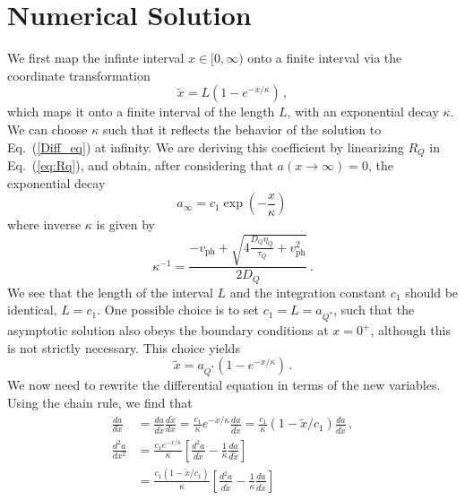\documentclass[superscriptaddress,amsmath,floatfix,aps,prc,twocolumn]{revtex4-1}
\newcommand{\AH}[1]{\textsf{\color{cyan}{\textsuperscript{AH}#1}}}
\newcommand{\JS}[1]{\textsf{\color{violet} {[\textsuperscript{JS}#1]}}}
\begin{document}
\section{Numerical Solution}
We first map the infinte interval $x\in[0,\infty)$ onto a finite interval via the coordinate transformation
\begin{equation}
    \tilde{x}=L\left(1-e^{-x/\kappa}\right) \, ,
\end{equation}
which maps it onto a finite interval of the length $L$, with an exponential decay $\kappa$. We can choose $\kappa$ such that it reflects the behavior of the solution to Eq.~(\ref{Diff_eq}) at infinity. We are deriving this coefficient by linearizing $R_Q$ in Eq.~(\ref{eq:Rq}), and obtain, after considering that $a(x\to\infty)=0$, the exponential decay
\begin{equation}
    a_\infty=c_1 \exp(-\frac{x}{\kappa}) \,
\end{equation}
where inverse $\kappa$ is given by
\begin{equation}
    \kappa^{-1}=\frac{-v_\mathrm{ph}+\sqrt{4\frac{D_Q\eta_Q}{\tau_Q}+v_\mathrm{ph}^2}}{2D_Q} \, .
\end{equation}
We see that the length of the interval $L$ and the integration constant $c_1$ should be identical, $L=c_1$. One possible choice is to set $c_1=L=a_{Q^*}$, such that the asymptotic solution also obeys the boundary conditions at $x=0^+$, although this is not strictly necessary. This choice yields
\begin{equation}
    \tilde{x}=a_{Q^*}\left(1-e^{-x/\kappa}\right) \, .
\end{equation}
We now need to rewrite the differential equation in terms of the new variables. Using the chain rule, we find that 
\begin{align}
    \frac{da}{dx}&=\frac{da}{d\tilde{x}}\frac{d\tilde{x}}{dx}=\frac{c_1}{\kappa}e^{-x/\kappa}\frac{da}{d\tilde{x}}=\frac{c_1}{\kappa}(1-\tilde{x}/c_1)\frac{da}{d\tilde{x}} \, ,\\
    \frac{d^2a}{dx^2}&=\frac{c_1e^{-x/\kappa}}{\kappa}\left[ \frac{d^2a}{d\tilde{x}}-\frac{1}{\kappa}\frac{da}{d\tilde{x}}\right] \nonumber \\
    &=\frac{c_1(1-\tilde{x}/c_1)}{\kappa}\left[ \frac{d^2a}{d\tilde{x}}-\frac{1}{\kappa}\frac{da}{d\tilde{x}}\right] \,
\end{align}
\end{document}
